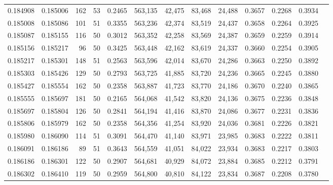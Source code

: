 \begin{tabular}{rrrrrrrrrrrrr}
0.184908 & 0.185006 &   162 &  53 &                                     0.2465 & 563,135 &  42,475 &  83,468 &  24,488 & 0.3657 & 0.2268 & 0.3934 \\
0.185008 & 0.185086 &   101 &  51 &                                     0.3355 & 563,236 &  42,374 &  83,519 &  24,437 & 0.3658 & 0.2264 & 0.3925 \\
0.185087 & 0.185155 &   116 &  50 &                                     0.3012 & 563,352 &  42,258 &  83,569 &  24,387 & 0.3659 & 0.2259 & 0.3914 \\
0.185156 & 0.185217 &    96 &  50 &                                     0.3425 & 563,448 &  42,162 &  83,619 &  24,337 & 0.3660 & 0.2254 & 0.3905 \\
0.185217 & 0.185301 &   148 &  51 &                                     0.2563 & 563,596 &  42,014 &  83,670 &  24,286 & 0.3663 & 0.2250 & 0.3892 \\
0.185303 & 0.185426 &   129 &  50 &                                     0.2793 & 563,725 &  41,885 &  83,720 &  24,236 & 0.3665 & 0.2245 & 0.3880 \\
0.185427 & 0.185554 &   162 &  50 &                                     0.2358 & 563,887 &  41,723 &  83,770 &  24,186 & 0.3670 & 0.2240 & 0.3865 \\
0.185555 & 0.185697 &   181 &  50 &                                     0.2165 & 564,068 &  41,542 &  83,820 &  24,136 & 0.3675 & 0.2236 & 0.3848 \\
0.185697 & 0.185804 &   126 &  50 &                                     0.2841 & 564,194 &  41,416 &  83,870 &  24,086 & 0.3677 & 0.2231 & 0.3836 \\
0.185806 & 0.185979 &   162 &  50 &                                     0.2358 & 564,356 &  41,254 &  83,920 &  24,036 & 0.3681 & 0.2226 & 0.3821 \\
0.185980 & 0.186090 &   114 &  51 &                                     0.3091 & 564,470 &  41,140 &  83,971 &  23,985 & 0.3683 & 0.2222 & 0.3811 \\
0.186091 & 0.186186 &    89 &  51 &                                     0.3643 & 564,559 &  41,051 &  84,022 &  23,934 & 0.3683 & 0.2217 & 0.3803 \\
0.186186 & 0.186301 &   122 &  50 &                                     0.2907 & 564,681 &  40,929 &  84,072 &  23,884 & 0.3685 & 0.2212 & 0.3791 \\
0.186302 & 0.186410 &   119 &  50 &                                     0.2959 & 564,800 &  40,810 &  84,122 &  23,834 & 0.3687 & 0.2208 & 0.3780 \\

\end{tabular}

